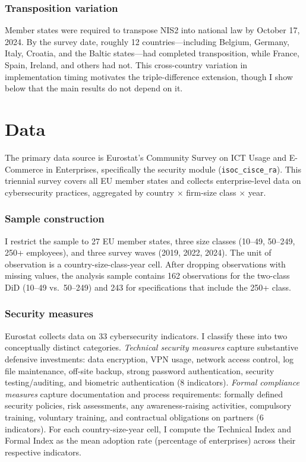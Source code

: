 \documentclass[12pt]{article}
\begin{document}
\subsubsection*{Transposition variation} Member states were required to transpose NIS2 into national law by October 17, 2024. By the survey date, roughly 12 countries---including Belgium, Germany, Italy, Croatia, and the Baltic states---had completed transposition, while France, Spain, Ireland, and others had not. This cross-country variation in implementation timing motivates the triple-difference extension, though I show below that the main results do not depend on it.


\section{Data}

The primary data source is Eurostat's Community Survey on ICT Usage and E-Commerce in Enterprises, specifically the security module (\texttt{isoc\_cisce\_ra}). This triennial survey covers all EU member states and collects enterprise-level data on cybersecurity practices, aggregated by country $\times$ firm-size class $\times$ year.

\subsubsection*{Sample construction} I restrict the sample to 27 EU member states, three size classes (10--49, 50--249, 250+ employees), and three survey waves (2019, 2022, 2024). The unit of observation is a country-size-class-year cell. After dropping observations with missing values, the analysis sample contains 162 observations for the two-class DiD (10--49 vs.\ 50--249) and 243 for specifications that include the 250+ class.

\subsubsection*{Security measures} Eurostat collects data on 33 cybersecurity indicators. I classify these into two conceptually distinct categories. \textit{Technical security measures} capture substantive defensive investments: data encryption, VPN usage, network access control, log file maintenance, off-site backup, strong password authentication, security testing/auditing, and biometric authentication (8 indicators). \textit{Formal compliance measures} capture documentation and process requirements: formally defined security policies, risk assessments, any awareness-raising activities, compulsory training, voluntary training, and contractual obligations on partners (6 indicators). For each country-size-year cell, I compute the Technical Index and Formal Index as the mean adoption rate (percentage of enterprises) across their respective indicators.
\end{document}
